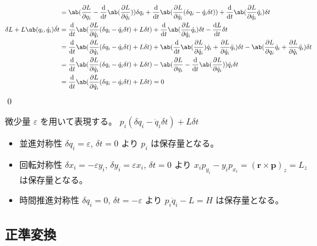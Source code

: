 \documentclass[uplatex,dvipdfmx,a4paper,11pt]{jlreq}
\makeatletter
\newcommand{\rr}{\bm{r}}
\newcommand{\pp}{\bm{p}}
\numberwithin{equation}{section}
\theoremstyle{definition}
\renewenvironment{proof}[1][\proofname]{\par
  \normalfont
  \topsep6\p@\@plus6\p@ \trivlist
  \item[\hskip\labelsep{\bfseries #1}\@addpunct{\bfseries}]\ignorespaces\quad\par
}{%
  \qed\endtrivlist\@endpefalse
}
\renewcommand\proofname{証明}
\makeatother
\begin{document}
\begin{proof}
\begin{align}
                                                  & = \ab(\diffp{L}{q_i} - \diff{}{t}\ab(\diffp{L}{\dot{q}_i}))\delta q_i + \diff{}{t}\ab(\diffp{L}{\dot{q}_i}(\delta q_i - \dot{q}_i\delta t)) + \diff{}{t}\ab(\diffp{L}{\dot{q}_i}\dot{q}_i)\delta t                                                     \\
    \delta L + L\ab(q_i, \dot{q}_i)\dot{\delta t} & = \diff{}{t}\ab(\diffp{L}{\dot{q}_i}(\delta q_i - \dot{q}_i\delta t) + L\delta t) + \diff{}{t}\ab(\diffp{L}{\dot{q}_i}\dot{q}_i)\delta t - \diff{L}{t}\delta t                                                                                         \\
                                                  & = \diff{}{t}\ab(\diffp{L}{\dot{q}_i}(\delta q_i - \dot{q}_i\delta t) + L\delta t) + \ab(\diff{}{t}\ab(\diffp{L}{\dot{q}_i})\dot{q}_i + \diffp{L}{\dot{q}_i}\ddot{q}_i)\delta t - \ab(\diffp{L}{q_i}\dot{q}_i + \diffp{L}{\dot{q}_i}\ddot{q}_i)\delta t \\
                                                  & = \diff{}{t}\ab(\diffp{L}{\dot{q}_i}(\delta q_i - \dot{q}_i\delta t) + L\delta t) - \ab(\diffp{L}{q_i} - \diff{}{t}\ab(\diffp{L}{\dot{q}_i}))\dot{q}_i\delta t                                                                                         \\
                                                  & = \diff{}{t}\ab(\diffp{L}{\dot{q}_i}(\delta q_i - \dot{q}_i\delta t) + L\delta t) = 0
  \end{align}
\end{proof}

\begin{example}
  微少量 $\varepsilon$ を用いて表現する。
  $p_i(\delta q_i - \dot{q}_i\delta t) + L\delta t$
  \begin{itemize}
    \item 並進対称性 $\delta q_i = \varepsilon$, $\delta t = 0$ より $p_i$ は保存量となる。
    \item 回転対称性 $\delta x_i = -\varepsilon y_i$, $\delta y_i = \varepsilon x_i$, $\delta t = 0$ より $x_ip_{y_i} - y_ip_{x_i} = (\rr\times\pp)_z = L_z$ は保存量となる。
    \item 時間推進対称性 $\delta q_i = 0$, $\delta t = -\varepsilon$ より $p_i\dot{q}_i - L = H$ は保存量となる。
  \end{itemize}
\end{example}


\subsection{正準変換}
\end{document}
